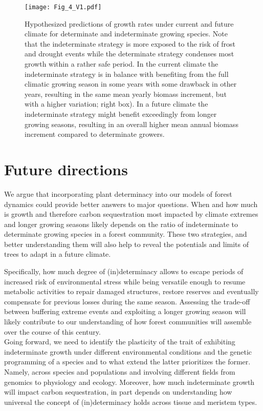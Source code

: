 \documentclass{article}
\begin{document}
	
								\begin{figure}
								\centering
								\texttt{[image: Fig\_4\_V1.pdf]} 
								\caption{Hypothesized predictions of growth rates under current and future climate for determinate and indeterminate growing species. Note that the indeterminate strategy is more exposed to the risk of frost and drought events while the determinate strategy condenses most growth within a rather safe period. In the current climate the indeterminate strategy is in balance with benefiting from the full climatic growing season in some years with some drawback in other years, resulting in the same mean yearly biomass increment, but with a higher variation; right box). In a future climate the indeterminate strategy might benefit exceedingly from longer growing seasons, resulting in an overall higher mean annual biomass increment compared to determinate growers.}
								\label{fig:fig_4xxx}
							\end{figure}
	\pagebreak
\section*{Future directions}
We argue that incorporating plant determinacy into our models of forest dynamics could provide better answers to major questions. When and how much is growth and therefore carbon sequestration most impacted by climate extremes and longer growing seasons likely depends on the ratio of indeterminate to determinate growing species in a forest community. These two strategies, and better understanding them will also help to reveal the potentials and limits of trees to adapt in a future climate.

Specifically, how much degree of (in)determinacy allows to escape periods of increased risk of environmental stress while being versatile enough to resume metabolic activities to repair damaged structures, restore reserves and eventually compensate for previous losses during the same season. Assessing the trade-off between buffering extreme events and exploiting a longer growing season will likely contribute to our understanding of how forest communities will assemble over the course of this century.\\

Going forward, we need to identify the plasticity of the trait of exhibiting indeterminate growth under different environmental conditions and the genetic programming of a species and to what extend the latter prioritizes the former. Namely, across species and populations and involving different fields from genomics to physiology and ecology. Moreover, how much indeterminate growth will impact carbon sequestration, in part depends on understanding how universal the concept of (in)determinacy holds across tissue and meristem types. 
\end{document}
